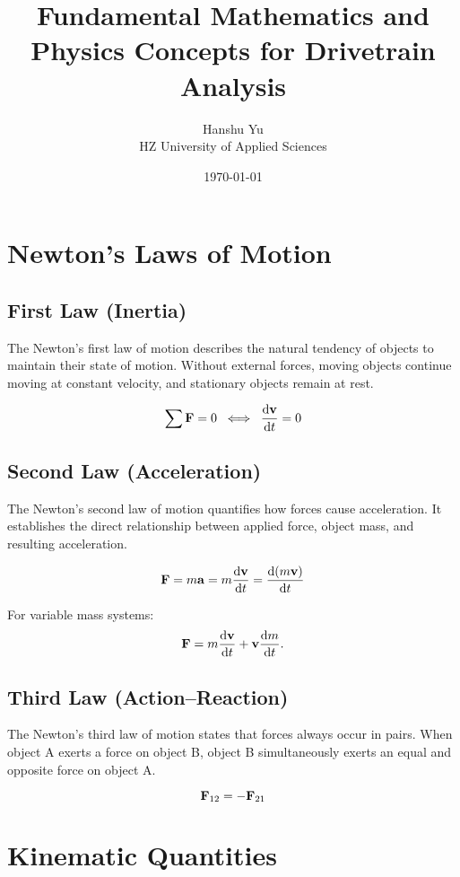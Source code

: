 \documentclass[11pt,a4paper]{article}
\title{Fundamental Mathematics and Physics Concepts for Drivetrain Analysis}
\author{Hanshu Yu\\HZ University of Applied Sciences}
\date{\today}
\begin{document}
\maketitle
\tableofcontents


\section{Newton's Laws of Motion}

\subsection*{First Law (Inertia)}
The Newton's first law of motion describes the natural tendency of objects to maintain their state of motion. Without external forces, moving objects continue moving at constant velocity, and stationary objects remain at rest. 
\begin{eqbox}
\[
\sum \vb{F} = 0 \;\;\Longleftrightarrow\;\; \dv{\vb{v}}{t} = 0
\]
\end{eqbox}


\subsection*{Second Law (Acceleration)}
The Newton's second law of motion quantifies how forces cause acceleration. It establishes the direct relationship between applied force, object mass, and resulting acceleration. 

\begin{eqbox}
\[
\vb{F} = m \vb{a} = m \dv{\vb{v}}{t} = \dv{(m\vb{v})}{t}
\]
\end{eqbox}
For variable mass systems:
\[
\vb{F} = m \dv{\vb{v}}{t} + \vb{v} \dv{m}{t}.
\]

\subsection*{Third Law (Action--Reaction)}
The Newton's third law of motion states that forces always occur in pairs. When object A exerts a force on object B, object B simultaneously exerts an equal and opposite force on object A.

\begin{eqbox}
\[
\vb{F}_{12} = - \vb{F}_{21}
\]
\end{eqbox}


\section{Kinematic Quantities}
\end{document}
